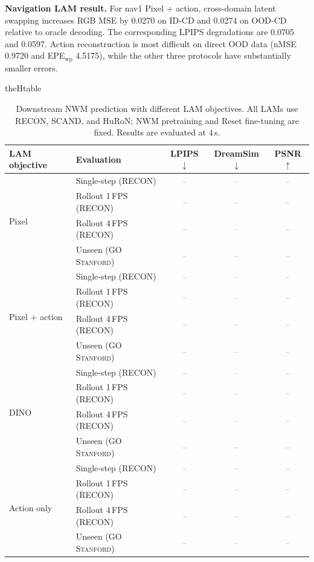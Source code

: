 \documentclass{article}
\newcommand{\TBD}{\textcolor{gray}{--}}
\newcommand{\UnseenData}{\textsc{GO Stanford}}
\newcommand{\LPIPS}{LPIPS$\downarrow$}
\newcommand{\DreamSim}{DreamSim$\downarrow$}
\newcommand{\PSNR}{PSNR$\uparrow$}
\newcommand{\tablepart}[1]{%
  \renewcommand{\thetable}{\arabic{table}#1}%
  \ifcsname theHtable\endcsname
    \renewcommand{\theHtable}{\arabic{table}.#1}%
  \fi
}
\begin{document}
\noindent\textbf{Navigation LAM result.}
For nav1 Pixel + action, cross-domain latent swapping increases RGB MSE by
0.0270 on ID-CD and 0.0274 on OOD-CD relative to oracle decoding. The
corresponding LPIPS degradations are 0.0705 and 0.0597. Action reconstruction
is most difficult on direct OOD data (nMSE 0.9720 and EPE$_{\mathrm{wp}}$
4.5175), while the other three protocols have substantially smaller errors.

\begin{table}[t]
  \tablepart{a}
  \caption{Downstream NWM prediction with different LAM objectives. All LAMs
  use RECON, SCAND, and HuRoN; NWM pretraining and Reset fine-tuning are fixed.
  Results are evaluated at 4\,s.}
  \label{tab:lam_downstream_prediction}
  \centering
  \small
  \setlength{\tabcolsep}{6pt}
  \renewcommand{\arraystretch}{1.02}
  \begin{tabular}{llccc}
    \toprule
    LAM objective & Evaluation & \LPIPS & \DreamSim & \PSNR \\
    \midrule
    \multirow{4}{*}{Pixel}
    & Single-step (RECON) & \TBD & \TBD & \TBD \\
    & Rollout 1\,FPS (RECON) & \TBD & \TBD & \TBD \\
    & Rollout 4\,FPS (RECON) & \TBD & \TBD & \TBD \\
    & Unseen (\UnseenData{}) & \TBD & \TBD & \TBD \\
    \midrule
    \multirow{4}{*}{Pixel + action}
    & Single-step (RECON) & \TBD & \TBD & \TBD \\
    & Rollout 1\,FPS (RECON) & \TBD & \TBD & \TBD \\
    & Rollout 4\,FPS (RECON) & \TBD & \TBD & \TBD \\
    & Unseen (\UnseenData{}) & \TBD & \TBD & \TBD \\
    \midrule
    \multirow{4}{*}{DINO}
    & Single-step (RECON) & \TBD & \TBD & \TBD \\
    & Rollout 1\,FPS (RECON) & \TBD & \TBD & \TBD \\
    & Rollout 4\,FPS (RECON) & \TBD & \TBD & \TBD \\
    & Unseen (\UnseenData{}) & \TBD & \TBD & \TBD \\
    \midrule
    \multirow{4}{*}{Action only}
    & Single-step (RECON) & \TBD & \TBD & \TBD \\
    & Rollout 1\,FPS (RECON) & \TBD & \TBD & \TBD \\
    & Rollout 4\,FPS (RECON) & \TBD & \TBD & \TBD \\
    & Unseen (\UnseenData{}) & \TBD & \TBD & \TBD \\
    \bottomrule
  \end{tabular}
\end{table}
\end{document}
